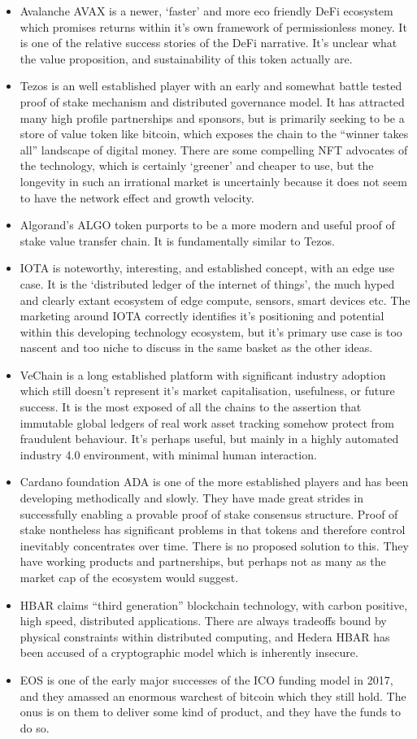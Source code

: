 \begin{itemize}
\item Avalanche AVAX is a newer, `faster' and more eco friendly DeFi ecosystem which promises returns within it's own framework of permissionless money. It is one of the relative success stories of the DeFi narrative. It's unclear what the value proposition, and sustainability of this token actually are.
\item Tezos is an well established player with an early and somewhat battle tested proof of stake mechanism and distributed governance model. It has attracted many high profile partnerships and sponsors, but is primarily seeking to be a store of value token like bitcoin, which exposes the chain to the ``winner takes all'' landscape of digital money. There are some compelling NFT advocates of the technology, which is certainly `greener' and cheaper to use, but the longevity in such an irrational market is uncertainly because it does not seem to have the network effect and growth velocity. 
\item Algorand's ALGO token purports to be a more modern and useful proof of stake value transfer chain. It is fundamentally similar to Tezos.
\item IOTA is noteworthy, interesting, and established concept, with an edge use case. It is the `distributed ledger of the internet of things', the much hyped and clearly extant ecosystem of edge compute, sensors, smart devices etc. The marketing around IOTA correctly identifies it's positioning and potential within this developing technology ecosystem, but it's primary use case is too nascent and too niche to discuss in the same basket as the other ideas.
\item VeChain is a long established platform with significant industry adoption which still doesn't represent it's market capitalisation, usefulness, or future success. It is the most exposed of all the chains to the assertion that immutable global ledgers of real work asset tracking somehow protect from fraudulent behaviour. It's perhaps useful, but mainly in a highly automated industry 4.0 environment, with minimal human interaction.
\item Cardano foundation ADA is one of the more established players and has been developing methodically and slowly. They have made great strides in successfully enabling a provable proof of stake consensus structure. Proof of stake nontheless has significant problems in that tokens and therefore control inevitably concentrates over time. There is no proposed solution to this. They have working products and partnerships, but perhaps not as many as the market cap of the ecosystem would suggest. 
\item HBAR claims ``third generation'' blockchain technology, with carbon positive, high speed, distributed applications. There are always tradeoffs bound by physical constraints within distributed computing, and Hedera HBAR has been accused of a cryptographic model which is inherently insecure.
\item EOS is one of the early major successes of the ICO funding model in 2017, and they amassed an enormous warchest of bitcoin which they still hold. The onus is on them to deliver some kind of product, and they have the funds to do so.
\end{itemize}
